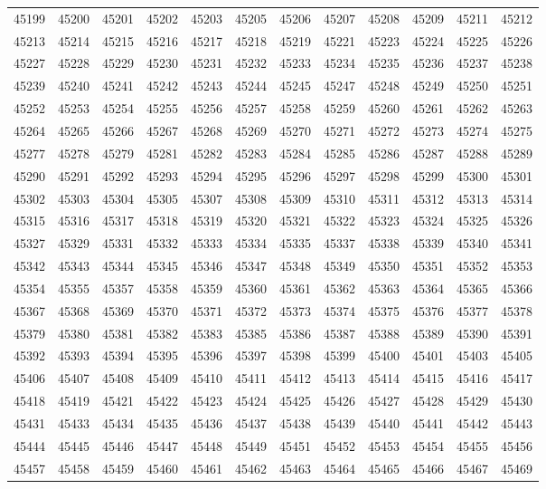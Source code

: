 \begin{center}
\begin{longtable}{llllllllllll}
45199 &45200 &45201 &45202 &45203 &45205 &45206 &45207 &45208 &45209 &45211 &45212 \\
45213 &45214 &45215 &45216 &45217 &45218 &45219 &45221 &45223 &45224 &45225 &45226 \\
45227 &45228 &45229 &45230 &45231 &45232 &45233 &45234 &45235 &45236 &45237 &45238 \\
45239 &45240 &45241 &45242 &45243 &45244 &45245 &45247 &45248 &45249 &45250 &45251 \\
45252 &45253 &45254 &45255 &45256 &45257 &45258 &45259 &45260 &45261 &45262 &45263 \\
45264 &45265 &45266 &45267 &45268 &45269 &45270 &45271 &45272 &45273 &45274 &45275 \\
45277 &45278 &45279 &45281 &45282 &45283 &45284 &45285 &45286 &45287 &45288 &45289 \\
45290 &45291 &45292 &45293 &45294 &45295 &45296 &45297 &45298 &45299 &45300 &45301 \\
45302 &45303 &45304 &45305 &45307 &45308 &45309 &45310 &45311 &45312 &45313 &45314 \\
45315 &45316 &45317 &45318 &45319 &45320 &45321 &45322 &45323 &45324 &45325 &45326 \\
45327 &45329 &45331 &45332 &45333 &45334 &45335 &45337 &45338 &45339 &45340 &45341 \\
45342 &45343 &45344 &45345 &45346 &45347 &45348 &45349 &45350 &45351 &45352 &45353 \\
45354 &45355 &45357 &45358 &45359 &45360 &45361 &45362 &45363 &45364 &45365 &45366 \\
45367 &45368 &45369 &45370 &45371 &45372 &45373 &45374 &45375 &45376 &45377 &45378 \\
45379 &45380 &45381 &45382 &45383 &45385 &45386 &45387 &45388 &45389 &45390 &45391 \\
45392 &45393 &45394 &45395 &45396 &45397 &45398 &45399 &45400 &45401 &45403 &45405 \\
45406 &45407 &45408 &45409 &45410 &45411 &45412 &45413 &45414 &45415 &45416 &45417 \\
45418 &45419 &45421 &45422 &45423 &45424 &45425 &45426 &45427 &45428 &45429 &45430 \\
45431 &45433 &45434 &45435 &45436 &45437 &45438 &45439 &45440 &45441 &45442 &45443 \\
45444 &45445 &45446 &45447 &45448 &45449 &45451 &45452 &45453 &45454 &45455 &45456 \\
45457 &45458 &45459 &45460 &45461 &45462 &45463 &45464 &45465 &45466 &45467 &45469 \\

\end{longtable}
\end{center}
